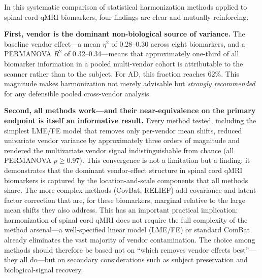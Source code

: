 \documentclass[12pt,a4paper]{article}
\begin{document}
\noindent{}

\vspace{6pt}
In this systematic comparison of statistical harmonization methods applied to spinal cord qMRI biomarkers, four findings are clear and mutually reinforcing.

\textbf{First, vendor is the dominant non-biological source of variance.} The baseline vendor effect---a mean $\eta^2$ of 0.28--0.30 across eight biomarkers, and a PERMANOVA $R^2$ of 0.32--0.34---means that approximately one-third of all biomarker information in a pooled multi-vendor cohort is attributable to the scanner rather than to the subject. For AD, this fraction reaches 62\%. This magnitude makes harmonization not merely advisable but \emph{strongly recommended} for any defensible pooled cross-vendor analysis.

\textbf{Second, all methods work---and their near-equivalence on the primary endpoint is itself an informative result.} Every method tested, including the simplest LME/FE model that removes only per-vendor mean shifts, reduced univariate vendor variance by approximately three orders of magnitude and rendered the multivariate vendor signal indistinguishable from chance (all PERMANOVA $p \geq 0.97$). This convergence is not a limitation but a finding: it demonstrates that the dominant vendor-effect structure in spinal cord qMRI biomarkers is captured by the location-and-scale components that all methods share. The more complex methods (CovBat, RELIEF) add covariance and latent-factor correction that are, for these biomarkers, marginal relative to the large mean shifts they also address. This has an important practical implication: harmonization of spinal cord qMRI does not require the full complexity of the method arsenal---a well-specified linear model (LME/FE) or standard ComBat already eliminates the vast majority of vendor contamination. The choice among methods should therefore be based not on ``which removes vendor effects best''---they all do---but on secondary considerations such as subject preservation and biological-signal recovery.
\end{document}
